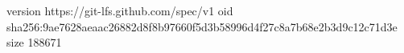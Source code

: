 version https://git-lfs.github.com/spec/v1
oid sha256:9ae7628aeaac26882d8f8b97660f5d3b58996d4f27c8a7b68e2b3d9c12c71d3e
size 188671
